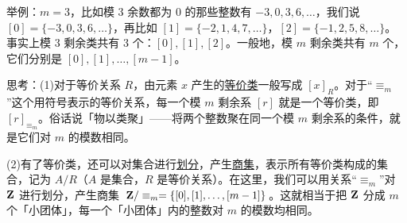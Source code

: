 \documentclass[UTF8]{ctexart}
\newcommand\Notes[1]{\textcolor{yellow!50!black}{\small #1}}
\newcommand\Example[1]{\textcolor{cyan!70!black}{\small #1}}
\newcommand\otherconcept[1]{\textcolor{green!40!black}{\underline{#1}}}
\newcommand\Z{\text{\textbf{Z}}}
\begin{document}
\begin{description}[itemsep=0pt, parsep=0pt]
    \Example{举例：$m=3$，比如模 3 余数都为 0 的那些整数有 $-3,0,3,6,\dots$，我们说 $[0]=\{-3,0,3,6,\dots\}$，再比如 $[1]=\{-2,1,4,7,\dots\}$，$[2]=\{-1,2,5,8,\dots\}$。事实上模 3 剩余类共有 3 个：$[0],[1],[2]$。一般地，模 $m$ 剩余类共有 $m$ 个，它们分别是 $[0],[1],\dots,[m-1]$。}

    \Notes{思考：(1)对于等价关系 $R$，由元素 $x$ 产生的\otherconcept{等价类}一般写成 $[x]_R$。对于“$\equiv_m$”这个用符号表示的等价关系，每一个模 $m$ 剩余系 $[r]$ 就是一个等价类，即 $[r]_{\equiv_m}$。俗话说「物以类聚」——将两个整数聚在同一个模 $m$ 剩余系的条件，就是它们对 $m$ 的模数相同。}

    \Notes{(2)有了等价类，还可以对集合进行\otherconcept{划分}，产生\otherconcept{商集}，表示所有等价类构成的集合，记为 $A/R$（$A$ 是集合，$R$ 是等价关系）。在这里，我们可以用关系“$\equiv_m$”对 $\Z$ 进行划分，产生商集 \otherconcept{$\Z / \equiv_m = \{[0], [1], \dots, [m-1]\}$}。这就相当于把 $\Z$ 分成 $m$ 个「小团体」，每一个「小团体」内的整数对 $m$ 的模数均相同。}
\end{description}


\newpage
{}
\BgThispage
\end{document}
